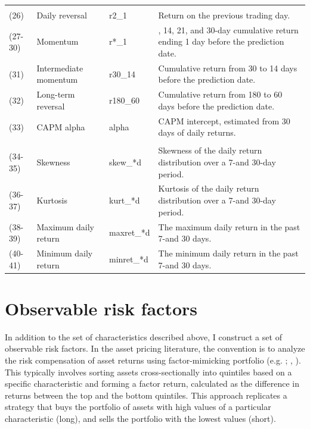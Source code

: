 \documentclass[
  12pt,
  a4paper,
  openany]{scrbook}
\begin{document}
\begin{table}
\begin{tabular}[t]{l>{\raggedright\arraybackslash}p{10em}l>{\raggedright\arraybackslash}p{27em}}
\addlinespace[0.3em]
\multicolumn{4}{l}{\textbf{Panel E: Past returns}}\\
\hspace{1em}(26) & Daily reversal & r2\_1 & Return on the previous trading day.\\
\hspace{1em}(27-30) & Momentum & r*\_1 & 7, 14, 21, and 30-day cumulative return ending 1 day before the prediction date.\\
\hspace{1em}(31) & Intermediate momentum & r30\_14 & Cumulative return from 30 to 14 days before the prediction date.\\
\hspace{1em}(32) & Long-term reversal & r180\_60 & Cumulative return from 180 to 60 days before the prediction date.\\
\hspace{1em}(33) & CAPM alpha & alpha & CAPM intercept, estimated from 30 days of daily returns.\\
\addlinespace[0.3em]
\multicolumn{4}{l}{\textbf{Panel F: Distribution}}\\
\hspace{1em}(34-35) & Skewness & skew\_*d & Skewness of the daily return distribution over a 7-and 30-day period.\\
\hspace{1em}(36-37) & Kurtosis & kurt\_*d & Kurtosis of the daily return distribution over a 7-and 30-day period.\\
\hspace{1em}(38-39) & Maximum daily return & maxret\_*d & The maximum daily return in the past 7-and 30 days.\\
\hspace{1em}(40-41) & Minimum daily return & minret\_*d & The minimum daily return in the past 7-and 30 days.\\
\bottomrule
\end{tabular}
\end{table}

\section{Observable risk factors}\label{observable-risk-factors}

In addition to the set of characteristics described above, I construct a
set of observable risk factors. In the asset pricing literature, the
convention is to analyze the risk compensation of asset returns using
factor-mimicking portfolio (e.g.
;
,
). This typically involves
sorting assets cross-sectionally into quintiles based on a specific
characteristic and forming a factor return, calculated as the difference
in returns between the top and the bottom quintiles. This approach
replicates a strategy that buys the portfolio of assets with high values
of a particular characteristic (long), and sells the portfolio with the
lowest values (short).
\end{document}
